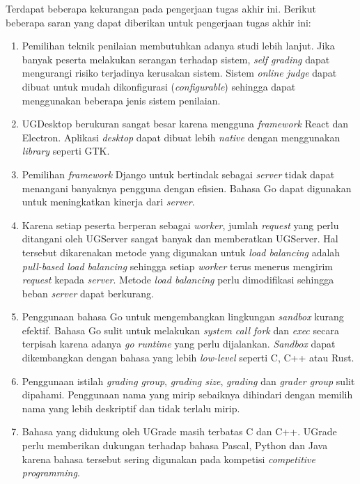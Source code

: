 \par Terdapat beberapa kekurangan pada pengerjaan tugas akhir ini. Berikut beberapa saran yang dapat diberikan untuk pengerjaan tugas akhir ini:
\begin{enumerate}
    \item Pemilihan teknik penilaian membutuhkan adanya studi lebih lanjut. Jika banyak peserta melakukan serangan terhadap sistem, \textit{self grading} dapat mengurangi risiko terjadinya kerusakan sistem. Sistem \textit{online judge} dapat dibuat untuk mudah dikonfigurasi (\textit{configurable}) sehingga dapat menggunakan beberapa jenis sistem penilaian.
    \item UGDesktop berukuran sangat besar karena mengguna \textit{framework} React dan Electron. Aplikasi \textit{desktop} dapat dibuat lebih \textit{native} dengan menggunakan \textit{library} seperti GTK.
    \item Pemilihan \textit{framework} Django untuk bertindak sebagai \textit{server} tidak dapat menangani banyaknya pengguna dengan efisien. Bahasa Go dapat digunakan untuk meningkatkan kinerja dari \textit{server}.
    \item Karena setiap peserta berperan sebagai \textit{worker}, jumlah \textit{request} yang perlu ditangani oleh UGServer sangat banyak dan memberatkan UGServer. Hal tersebut dikarenakan metode yang digunakan untuk \textit{load balancing} adalah \textit{pull-based load balancing} sehingga setiap \textit{worker} terus menerus mengirim \textit{request} kepada \textit{server}. Metode \textit{load balancing} perlu dimodifikasi sehingga beban \textit{server} dapat berkurang.
    \item Penggunaan bahasa Go untuk mengembangkan lingkungan \textit{sandbox} kurang efektif. Bahasa Go sulit untuk melakukan \textit{system call fork} dan \textit{exec} secara terpisah karena adanya \textit{go runtime} yang perlu dijalankan. \textit{Sandbox} dapat dikembangkan dengan bahasa yang lebih \textit{low-level} seperti C, C++ atau Rust. 
    \item Penggunaan istilah \textit{grading group}, \textit{grading size}, \textit{grading} dan \textit{grader group} sulit dipahami. Penggunaan nama yang mirip sebaiknya dihindari dengan memilih nama yang lebih deskriptif dan tidak terlalu mirip. 
    \item Bahasa yang didukung oleh UGrade masih terbatas C dan C++. UGrade perlu memberikan dukungan terhadap bahasa Pascal, Python dan Java karena bahasa tersebut sering digunakan pada kompetisi \textit{competitive programming}.
\end{enumerate}
